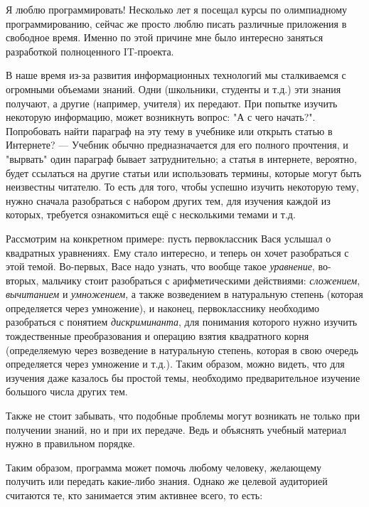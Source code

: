 \documentclass[a4paper,14pt]{extarticle}
\begin{document}
 \sloppy



Я люблю программировать! Несколько лет я посещал курсы по олимпиадному
программированию, сейчас же просто люблю писать различные приложения в
свободное время. Именно по этой причине мне было интересно заняться разработкой
полноценного IT-проекта.

В наше время из-за развития информационных технологий мы сталкиваемся с
огромными объемами знаний. Одни (школьники, студенты и т.д.) эти знания
получают, а другие (например, учителя) их передают. При попытке изучить
некоторую информацию, может возникнуть вопрос: "А с чего начать?". Попробовать
найти параграф на эту тему в учебнике или открыть статью в Интернете? ---
Учебник обычно предназначается для его полного прочтения, и "вырвать" один
параграф бывает затруднительно; а статья в интернете, вероятно, будет ссылаться
на другие статьи или использовать термины, которые могут быть неизвестны
читателю. То есть для того, чтобы успешно изучить некоторую тему, нужно сначала
разобраться с набором других тем, для изучения каждой из которых, требуется
ознакомиться ещё с несколькими темами и т.д.

Рассмотрим на конкретном примере: пусть первоклассник Вася услышал о квадратных
уравнениях. Ему стало интересно, и теперь он хочет разобраться с этой темой.
Во-первых, Васе надо узнать, что вообще такое \textit{уравнение}, во-вторых, мальчику
стоит разобраться с арифметическими действиями: \textit{сложением}, \textit{вычитанием} и
\textit{умножением}, а также возведением в натуральную степень (которая определяется
через умножение), и наконец, первокласснику необходимо разобраться с понятием
\textit{дискриминанта}, для понимания которого нужно изучить тождественные
преобразования и операцию взятия квадратного корня (определяемую через
возведение в натуральную степень, которая в свою очередь определяется через
умножение и т.д.). Таким образом, можно видеть, что для изучения даже казалось
бы простой темы, необходимо предварительное изучение большого числа других тем.

Также не стоит забывать, что подобные проблемы могут возникать не только при
получении знаний, но и при их передаче. Ведь и объяснять учебный материал нужно
в правильном порядке.

Таким образом, программа может помочь любому человеку, желающему получить или
передать какие-либо знания. Однако же целевой аудиторией считаются те, кто
занимается этим активнее всего, то есть:
\end{document}
